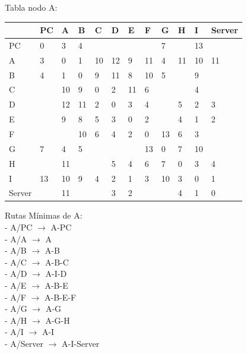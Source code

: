 \documentclass[a4paper]{article}
\begin{document}
\begin{table}[ht]
Tabla nodo A:\\
\begin{tabular}{|l|l|l|l|l|l|l|l|l|l|l|l|}
\hline
       & PC & A  & B & C & D & E & F & G & H & I  & Server \\ \hline
PC     & 0  & 3  & 4 &   &   &   &   & 7 &   & 13 &        \\ \hline
A      & 3  & 0  & 1 & 10& 12& 9 & 11& 4 & 11& 10 & 11     \\ \hline
B      & 4  & 1  & 0 & 9 & 11& 8 & 10& 5 &   & 9  &        \\ \hline
C      &    & 10 & 9 & 0 & 2 & 11& 6 &   &   & 4  &        \\ \hline
D      &    & 12 & 11& 2 & 0 & 3 & 4 &   & 5 & 2  & 3      \\ \hline
E      &    & 9  & 8 & 5 & 3 & 0 & 2 &   & 4 & 1  & 2      \\ \hline
F      &    &    & 10& 6 & 4 & 2 & 0 & 13& 6 & 3  &        \\ \hline
G      & 7  & 4  & 5 &   &   &   & 13& 0 & 7 & 10 &        \\ \hline
H      &    & 11 &   &   & 5 & 4 & 6 & 7 & 0 & 3  & 4      \\ \hline
I      & 13 & 10 & 9 & 4 & 2 & 1 & 3 & 10& 3 & 0  & 1      \\ \hline
Server &    & 11 &   &   & 3 & 2 &   &   & 4 & 1  & 0      \\ \hline
\end{tabular}

Rutas Mínimas de A:\\
-	A/PC  $\rightarrow$  A-PC\\
-	A/A  $\rightarrow$  A\\
-	A/B  $\rightarrow$  A-B\\
-	A/C  $\rightarrow$  A-B-C\\
-	A/D  $\rightarrow$  A-I-D\\
-	A/E  $\rightarrow$  A-B-E\\
-	A/F  $\rightarrow$  A-B-E-F\\
-	A/G  $\rightarrow$  A-G\\
-	A/H  $\rightarrow$  A-G-H\\
-	A/I  $\rightarrow$  A-I\\
-	A/Server  $\rightarrow$  A-I-Server\\
\end{table}
\end{document}
